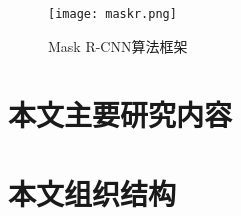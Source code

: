 \begin{figure}[htbp]
    \centering
    \texttt{[image: maskr.png]}
    \caption{Mask R-CNN算法框架}
    \label{maskr}
\end{figure}

\section{本文主要研究内容}

\section{本文组织结构}